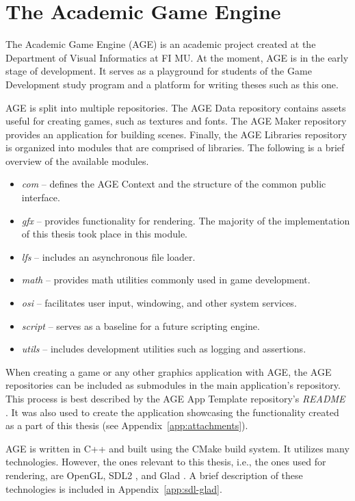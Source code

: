 \documentclass[
  digital,     %
  oneside,     %
  nosansbold,  %
  nocolorbold, %
  lof,         %
  lot,         %
]{fithesis4}
\begin{document}
\chapter{The Academic Game Engine}
The Academic Game Engine (AGE) is an academic project created at the Department of Visual Informatics
at FI MU. At the moment, AGE is in the early stage of development. It serves as a playground for students
of the Game Development study program and a platform for writing theses such as this one.

AGE is split into multiple repositories.
The AGE Data repository contains assets useful for creating games, such as textures and fonts.
The AGE Maker repository provides an application for building scenes. Finally, the AGE Libraries
repository is organized into modules that are comprised of libraries. The following is a brief overview
of the available modules.
\begin{itemize}
    \item \textit{com} -- defines the AGE Context and the structure of the common public interface.
    \item \textit{gfx} -- provides functionality for rendering. The majority of the implementation of this thesis
    took place in this module.
    \item \textit{lfs} -- includes an asynchronous file loader.
    \item \textit{math} -- provides math utilities commonly used in game development.
    \item \textit{osi} -- facilitates user input, windowing, and other system services.
    \item \textit{script} -- serves as a baseline for a future scripting engine.
    \item \textit{utils} -- includes development utilities such as logging and assertions.
\end{itemize}

When creating a game or any other graphics application with AGE, the AGE repositories can be included as submodules
in the main application's repository. This process is best described by the AGE App Template repository's
\textit{README} \cite{age-app-template-readme}. It was also used to create the application
showcasing the functionality created as a part of this thesis (see Appendix~\ref{app:attachments}).

AGE is written in C++ and built using the CMake build system. It utilizes many technologies. However,
the ones relevant to this thesis, i.e., the ones used for rendering, are OpenGL, SDL2 \cite{sdl}, and Glad \cite{glad}.
A brief description of these technologies is included in Appendix~\ref{app:sdl-glad}.
\end{document}
